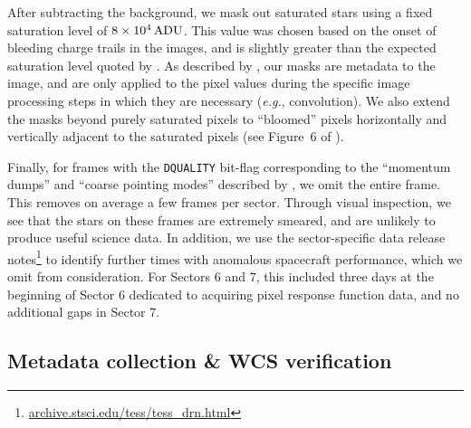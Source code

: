 \documentclass[12pt,twocolumn,tighten]{aastex62}
\begin{document}

After subtracting the background, we mask out saturated stars using a
fixed saturation level of $8\times10^4\,{\rm ADU}$. This value was
chosen based on the onset of bleeding charge trails in the images, and
is slightly greater than the expected saturation level quoted by
\citet{vanderspek_2018}.  As described by \citet{Pal_2009}, our masks
are metadata to the image, and are only applied to the pixel values
during the specific image processing steps in which they are necessary
({\it e.g.}, convolution). We also extend the masks beyond purely
saturated pixels to ``bloomed'' pixels horizontally and vertically
adjacent to the saturated pixels (see Figure~6 of \citealt{Pal_2009}).

Finally, for frames with the \texttt{DQUALITY} bit-flag corresponding
to the ``momentum dumps'' and ``coarse pointing modes'' described by
\citet{vanderspek_2018}, we omit the entire frame.  This removes on
average a few frames per sector. Through visual inspection, we see
that the stars on these frames are extremely smeared, and are unlikely
to produce useful science data.  In addition, we use the
sector-specific data release notes\footnote{\url{
  archive.stsci.edu/tess/tess_drn.html}} to identify further times
with anomalous spacecraft performance, which we omit from
consideration.
For Sectors 6 and 7, this included three days at the beginning of
Sector 6 dedicated to acquiring pixel response function data, and no
additional gaps in Sector 7.

\subsection{Metadata collection \& WCS verification}
\label{subsec:metadatacollection}
\end{document}
